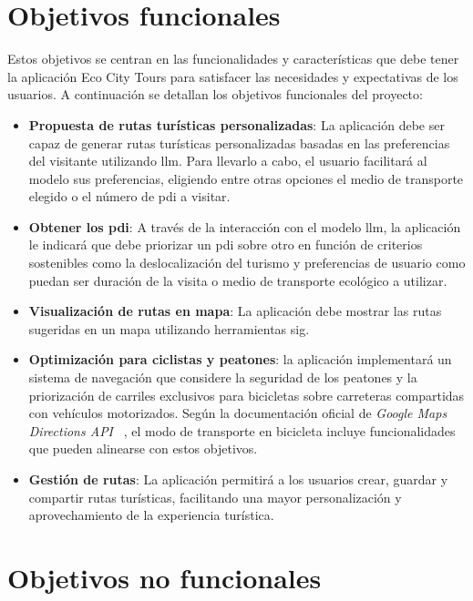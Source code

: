 
\section{Objetivos funcionales}

Estos objetivos se centran en las funcionalidades y características que debe tener la aplicación Eco City Tours para satisfacer las necesidades y expectativas de los usuarios. A continuación se detallan los objetivos funcionales del proyecto:

\begin{itemize}
    \item \textbf{Propuesta de rutas turísticas personalizadas}: La aplicación debe ser capaz de generar rutas turísticas personalizadas basadas en las preferencias del visitante utilizando \acrfull{llm}. Para llevarlo a cabo, el usuario facilitará al modelo sus preferencias, eligiendo entre otras opciones el medio de transporte elegido o el número de \acrfull{pdi} a visitar.
    \item \textbf{Obtener los \acrfull{pdi}}: A través de la interacción con el modelo \acrshort{llm}, la aplicación le indicará que debe priorizar un \acrshort{pdi} sobre otro en función de criterios sostenibles como la deslocalización del turismo y preferencias de usuario como puedan ser duración de la visita o medio de transporte ecológico a utilizar.
    \item \textbf{Visualización de rutas en mapa}: La aplicación debe mostrar las rutas sugeridas en un mapa utilizando herramientas \acrshort{sig}.
    \item \textbf{Optimización para ciclistas y peatones}: la aplicación implementará un sistema de navegación que considere la seguridad de los peatones y la priorización de carriles exclusivos para bicicletas sobre carreteras compartidas con vehículos motorizados. Según la documentación oficial de \textit{Google Maps Directions API }~\cite{google_directions}, el modo de transporte en bicicleta incluye funcionalidades que pueden alinearse con estos objetivos.
    \item \textbf{Gestión de rutas}: La aplicación permitirá a los usuarios crear, guardar y compartir rutas turísticas, facilitando una mayor personalización y aprovechamiento de la experiencia turística.
    

\end{itemize}

\section{Objetivos no funcionales}

